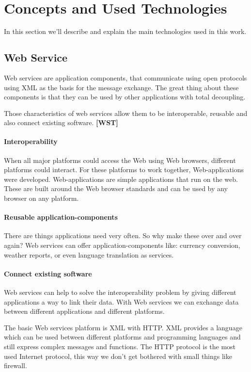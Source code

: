\documentclass[11pt,a4paper]{article}
\begin{document}
\section{Concepts and Used Technologies}
In this section we'll describe and explain the main technologies used in this work.

\subsection{Web Service}
Web services are application components, that communicate using open protocols using XML as the basis for the message exchange. The great thing about these components is that they can be used by other applications with total decoupling.

Those characteristics of web services allow them to be interoperable, reusable and also connect existing software. \textbf{[WST]}

\paragraph{Interoperability}
When all major platforms could access the Web using Web browsers, different platforms could interact. For these platforms to work together, Web-applications were developed. Web-applications are simple applications that run on the web. These are built around the Web browser standards and can be used by any browser on any platform.

\paragraph{Reusable application-components}
There are things applications need very often. So why make these over and over again? Web services can offer application-components like: currency conversion, weather reports, or even language translation as services.

\paragraph{Connect existing software}
Web services can help to solve the interoperability problem by giving different applications a way to link their data. With Web services we can exchange data between different applications and different platforms.

The basic Web services platform is XML with HTTP. XML provides a language which can be used between different platforms and programming languages and still express complex messages and functions. The HTTP protocol is the most used Internet protocol, this way we don't get bothered with small things like firewall.
\end{document}

